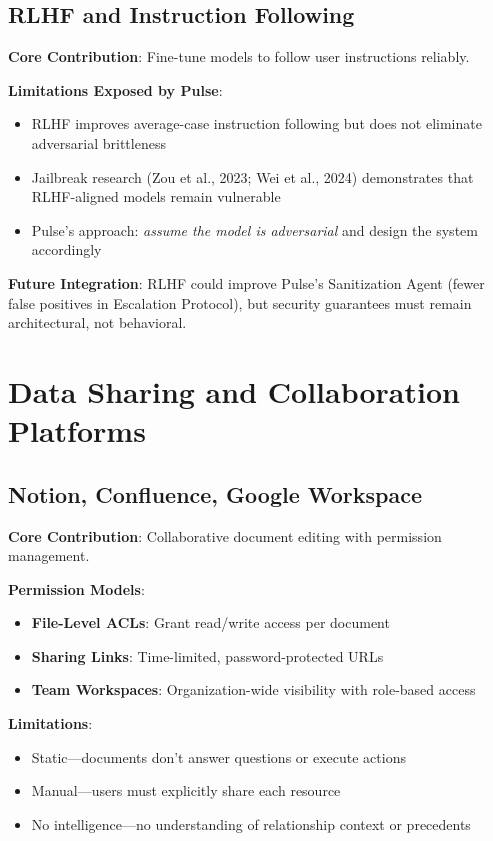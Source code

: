 \subsection{RLHF and Instruction Following}

\textbf{Core Contribution}: Fine-tune models to follow user instructions reliably.

\textbf{Limitations Exposed by Pulse}:
\begin{itemize}
    \item RLHF improves average-case instruction following but does not eliminate adversarial brittleness
    \item Jailbreak research (Zou et al., 2023; Wei et al., 2024) demonstrates that RLHF-aligned models remain vulnerable
    \item Pulse's approach: \textit{assume the model is adversarial} and design the system accordingly
\end{itemize}

\textbf{Future Integration}: RLHF could improve Pulse's Sanitization Agent (fewer false positives in Escalation Protocol), but security guarantees must remain architectural, not behavioral.

\section{Data Sharing and Collaboration Platforms}

\subsection{Notion, Confluence, Google Workspace}

\textbf{Core Contribution}: Collaborative document editing with permission management.

\textbf{Permission Models}:
\begin{itemize}
    \item \textbf{File-Level ACLs}: Grant read/write access per document
    \item \textbf{Sharing Links}: Time-limited, password-protected URLs
    \item \textbf{Team Workspaces}: Organization-wide visibility with role-based access
\end{itemize}

\textbf{Limitations}:
\begin{itemize}
    \item Static—documents don't answer questions or execute actions
    \item Manual—users must explicitly share each resource
    \item No intelligence—no understanding of relationship context or precedents
\end{itemize}

